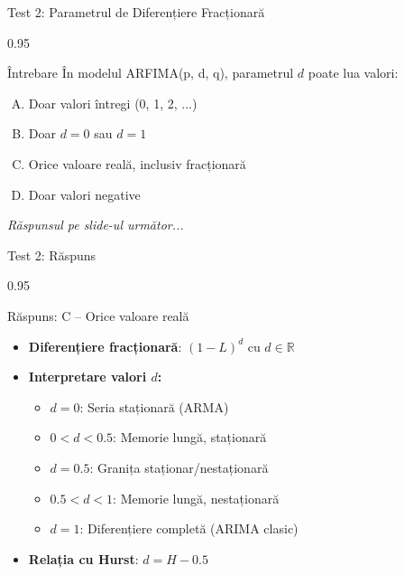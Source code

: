 \documentclass[9pt, aspectratio=169, t]{beamer}
\begin{document}
\begin{frame}{Test 2: Parametrul de Diferențiere Fracționară}
    \begin{cminipage}{0.95\textwidth}
    \begin{alertblock}{Întrebare}
        În modelul ARFIMA(p, d, q), parametrul $d$ poate lua valori:
    \end{alertblock}

    \vspace{0.3cm}

    \begin{enumerate}[A)]\setlength{\itemsep}{0pt}
        \item Doar valori întregi (0, 1, 2, ...)
        \item Doar $d = 0$ sau $d = 1$
        \item Orice valoare reală, inclusiv fracționară
        \item Doar valori negative
    \end{enumerate}

    \vspace{0.5cm}
    \begin{flushright}\textit{Răspunsul pe slide-ul următor...}\end{flushright}
    \end{cminipage}
\end{frame}

\begin{frame}{Test 2: Răspuns}
    \begin{cminipage}{0.95\textwidth}
    \begin{exampleblock}{Răspuns: C -- Orice valoare reală}
        \begin{itemize}\setlength{\itemsep}{0pt}
            \item \textbf{Diferențiere fracționară}: $(1-L)^d$ cu $d \in \mathbb{R}$
            \item \textbf{Interpretare valori $d$:}
            \begin{itemize}\setlength{\itemsep}{0pt}
                \item $d = 0$: Seria staționară (ARMA)
                \item $0 < d < 0.5$: Memorie lungă, staționară
                \item $d = 0.5$: Granița staționar/nestaționară
                \item $0.5 < d < 1$: Memorie lungă, nestaționară
                \item $d = 1$: Diferențiere completă (ARIMA clasic)
            \end{itemize}
            \item \textbf{Relația cu Hurst}: $d = H - 0.5$
        \end{itemize}
    \end{exampleblock}
    \end{cminipage}
\end{frame}
\end{document}
